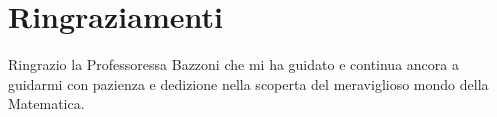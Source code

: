 
\begingroup
\let\clearpage\relax
\let\cleardoublepage\relax
\let\cleardoublepage\relax
\chapter*{Ringraziamenti}
Ringrazio la Professoressa Bazzoni che mi ha guidato e continua ancora a guidarmi con pazienza e dedizione nella scoperta del meraviglioso mondo della Matematica.
\endgroup

